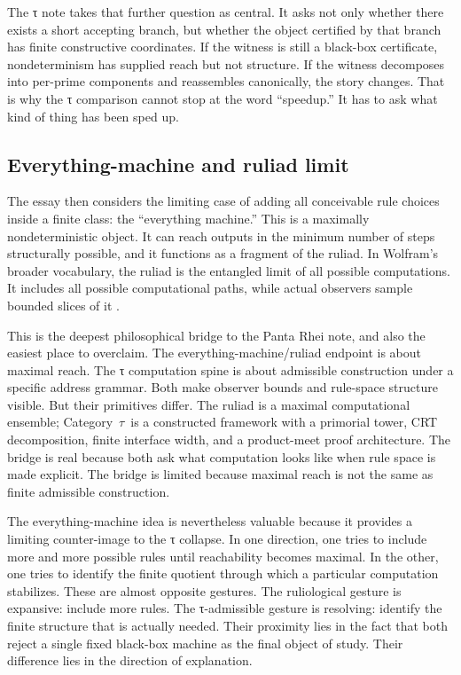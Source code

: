 \documentclass{pantarhei-researchnote}
\newcommand{\CategoryTau}{Category~\(\tau\)}
\begin{document}
The τ note takes that further question as central. It asks not only
whether there exists a short accepting branch, but whether the object
certified by that branch has finite constructive coordinates. If the
witness is still a black-box certificate, nondeterminism has supplied
reach but not structure. If the witness decomposes into per-prime
components and reassembles canonically, the story changes. That is why
the τ comparison cannot stop at the word ``speedup.'' It has to ask what
kind of thing has been sped up.

\subsection{Everything-machine and ruliad limit}

The essay then considers the limiting case of adding all conceivable rule
choices inside a finite class: the ``everything machine.'' This is a
maximally nondeterministic object. It can reach outputs in the minimum
number of steps structurally possible, and it functions as a fragment of
the ruliad. In Wolfram's broader vocabulary, the ruliad is the entangled
limit of all possible computations. It includes all possible computational
paths, while actual observers sample bounded slices of it
\cite{Wolfram2026RuliologicalPNP}.

This is the deepest philosophical bridge to the Panta Rhei note, and also
the easiest place to overclaim. The everything-machine/ruliad endpoint is
about maximal reach. The τ computation spine is about admissible
construction under a specific address grammar. Both make observer bounds
and rule-space structure visible. But their primitives differ. The ruliad
is a maximal computational ensemble; \CategoryTau\ is a constructed
framework with a primorial tower, CRT decomposition, finite interface
width, and a product-meet proof architecture. The bridge is real because
both ask what computation looks like when rule space is made explicit. The
bridge is limited because maximal reach is not the same as finite
admissible construction.

The everything-machine idea is nevertheless valuable because it provides
a limiting counter-image to the τ collapse. In one direction, one tries
to include more and more possible rules until reachability becomes
maximal. In the other, one tries to identify the finite quotient through
which a particular computation stabilizes. These are almost opposite
gestures. The ruliological gesture is expansive: include more rules. The
τ-admissible gesture is resolving: identify the finite structure that is
actually needed. Their proximity lies in the fact that both reject a
single fixed black-box machine as the final object of study. Their
difference lies in the direction of explanation.
\end{document}
